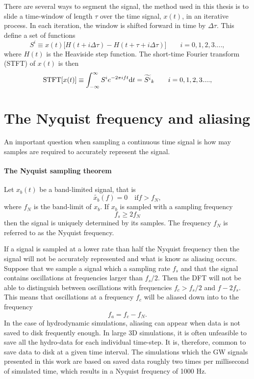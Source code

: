 There are several ways to segment the signal, the method used in this thesis is to slide a time-window of length $\tau$ over the time signal, $x(t)$, in an iterative
process. In each iteration, the window is shifted forward in time by $\Delta \tau$.
This define a set of functions
\begin{equation}
S^i \equiv x(t) \big[ H(t+i \Delta \tau) - H(t + \tau + i \Delta \tau) \big] \qquad i = 0,1,2,3 ....,
\end{equation}
where $H(t)$ is the Heaviside step function.
The short-time Fourier transform (STFT) of $x(t)$ is then
\begin{equation}\label{eqSA:STFT}
\text{STFT}[x(t)] \equiv \int_{-\infty}^{\infty} S^i e^{-2 \pi i f t} \mathrm{d} t 
= \widetilde{S^i}_k \qquad i = 0,1,2,3 ....,                                                         
\end{equation}

\section{The Nyquist frequency and aliasing}
An important question when sampling a continuous 
time signal is how may samples are required to accurately represent the
signal.
\begin{mdframed}[nobreak=true]
\paragraph{The Nyquist sampling theorem}
Let $x_b(t)$ be a band-limited signal, that is
\begin{equation}
\widetilde{x_b}(f) = 0 \quad \text{if} f > f_N,
\end{equation}
where $f_N$ is the band-limit of $x_b$. If $x_b$ is sampled with a sampling frequency
\begin{equation}
f_s \geq 2 f_N
\end{equation}
then the signal is uniquely determined by its samples. The frequency $f_N$ is referred to 
as the Nyquist frequency.
\end{mdframed}

If a signal is sampled at a lower rate than half the Nyquist frequency then
the signal will not be accurately represented and what is know as aliasing occurs.
Suppose that we sample a signal which a sampling rate $f_s$ and that the signal contains oscillations 
at frequencies larger than $f_s /2$. Then the 
DFT will not be able to distinguish between oscillations with 
frequencies $f_c > f_s/2$ and $f - 2 f_s$. This means that oscillations at a frequency
$f_c$ will be aliased down into to the frequency
\begin{equation}
f_a = f_c - f_N.
\end{equation}
In the case of hydrodynamic simulations, aliasing can appear when data is not saved
to disk frequently enough. In large 3D simulations, it is often unfeasible to save all the hydro-data for each individual time-step. It is, therefore, common to
save data to disk at a given time interval. The simulations which the GW signals presented
in this work are based on saved data roughly two times per millisecond of simulated time, which results in a Nyquist frequency of
1000 Hz. 

